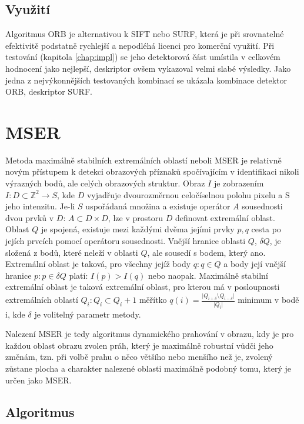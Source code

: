 \subsection{Využití}

Algoritmus ORB je alternativou k SIFT nebo SURF, která je při srovnatelné efektivitě podstatně rychlejší a nepodléhá licenci pro komerční využití. Při testování (kapitola \ref{chap:impl}) se jeho detektorová část umístila v celkovém hodnocení jako nejlepší, deskriptor ovšem vykazoval velmi slabé výsledky. Jako jedna z nejvýkonnějších testovaných kombinací se ukázala kombinace detektor ORB, deskriptor SURF.

		
\section{MSER}

	Metoda maximálně stabilních extremálních oblastí neboli MSER \cite{matas2004robust} je relativně novým přístupem k detekci obrazových příznaků spočívajícím v identifikaci nikoli výrazných bodů, ale celých obrazových struktur. Obraz $I$ je zobrazením $I: D \subset \mathbb{Z}^2 \rightarrow S$, kde $D$ vyjadřuje dvourozměrnou celočíselnou polohu pixelu a S jeho intenzitu. Je-li $S$ uspořádaná množina a existuje operátor $A$ sousednosti dvou prvků v $D$:  $A \subset D\times D$, lze v prostoru $D$ definovat extremální oblast. 	Oblast $Q$ je spojená, existuje mezi každými dvěma jejími prvky $p, q$ cesta po jejích prvcích pomocí operátoru sousednosti. Vnější hranice oblasti $Q$, $\delta Q$, je složená z bodů, které neleží v oblasti $Q$, ale sousedí s bodem, který ano. Extremální oblast je taková, pro všechny jejíž body $q: q \in Q$ a body její vnější hranice $p: p \in \delta Q$ platí: $I(p) > I(q)$ nebo naopak. Maximálně stabilní extremální oblast je taková extremální oblast, pro kterou má v posloupnosti extremálních oblastí $Q_i : Q_i \subset Q_i+1$ měřítko $q(i) = \frac{\lvert Q_{i+\delta} \setminus Q_{i-\delta} \rvert}{\lvert Q_i \rvert}$ minimum v bodě i, kde $\delta$ je volitelný parametr metody.
	
	Nalezení MSER je tedy algoritmus dynamického prahování v obrazu, kdy je pro každou oblast obrazu zvolen práh, který je maximálně robustní vůdči jeho změnám, tzn. při volbě prahu o něco většího nebo menšího než je, zvolený zůstane plocha a charakter nalezené oblasti maximálně podobný tomu, který je určen jako MSER.
	
	\subsection{Algoritmus}
	
